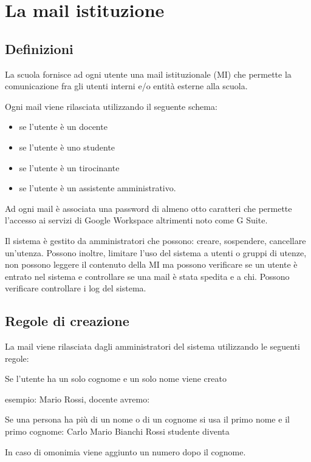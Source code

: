 \chapter{La mail istituzione}
\section{Definizioni}
La scuola fornisce ad ogni utente una mail istituzionale (MI) che permette 
la comunicazione fra gli utenti interni e/o entità esterne alla scuola.

Ogni mail viene rilasciata utilizzando il seguente schema:
\begin{itemize}
	\item {} se l'utente è un docente
	\item {} se l'utente è uno studente
	\item {} se l'utente è un 
	tirocinante
	\item {} se l'utente è un 
	assistente 
	amministrativo.
\end{itemize}

Ad ogni mail è associata una password di almeno otto caratteri che permette 
l'accesso ai servizi di  \textenglish{Google Workspace} altrimenti noto come \textenglish{G Suite}.

Il sistema è gestito da amministratori che possono: creare, sospendere, cancellare un'utenza. Possono inoltre, limitare l'uso del sistema a utenti o gruppi di utenze, non possono leggere il contenuto della MI ma possono verificare se un utente è entrato nel sistema e controllare se una mail è stata spedita e a chi. 
Possono verificare controllare i log del sistema.

\section{Regole di creazione} 
La mail viene rilasciata dagli amministratori del sistema utilizzando le seguenti 
regole:

Se l'utente ha un solo cognome e un solo nome viene creato
\begin{center}
\end{center}
esempio: Mario Rossi, docente avremo:
\begin{center}
\end{center}
Se una persona ha più di un nome o di un cognome si usa il primo nome e il  
primo cognome: Carlo Mario Bianchi Rossi studente diventa
\begin{center}
\end{center}
In caso di omonimia viene aggiunto un numero dopo il cognome.
